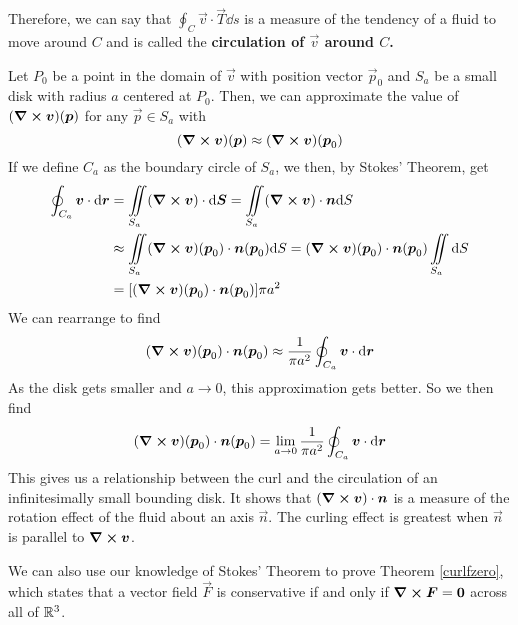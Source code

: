 Therefore, we can say that $\oint_C \vec v\cdot \vec T \dd s$ is a measure of the tendency of a fluid to move around $C$ and is called the \bf{circulation} of $\vec v$ around $C$. \par
Let $P_0$ be a point in the domain of $\vec v$ with position vector $\vec p_0$ and $S_a$ be a small disk with radius $a$ centered at $P_0$. Then, we can approximate the value of $(\curl \boldsymbol{v})(\boldsymbol{p})$ for any $\vec p\in S_a$ with
\[ (\curl \boldsymbol{v})(\boldsymbol{p}) \approx (\curl \boldsymbol{v})(\boldsymbol{p}_0)\]
If we define $C_a$ as the boundary circle of $S_a$, we then, by Stokes' Theorem, get
\begin{align*}
    \oint_{C_a} \vec v\cdot \dd \vec r &= \iint\limits_{S_a}(\curl \vec v)\cdot \dd \vec S = \iint\limits_{S_a}( \curl \vec v) \cdot \vec n \dd S \\
    &\approx \iint\limits_{S_a} (\curl \vec v)(\vec p_0) \cdot \vec n(\vec p_0) \dd S = (\curl \vec v)(\vec p_0) \cdot \vec n(\vec p_0)\iint\limits_{S_a}\dd S \\
    &= \bqty{(\curl \vec v)(\vec p_0) \cdot \vec n(\vec p_0)} \pi a^2
\end{align*}
We can rearrange to find
\[ (\curl \boldsymbol{v})(\boldsymbol{p}_0)\cdot \boldsymbol{n}(\boldsymbol{p}_0) \approx \frac{1}{\pi a^2} \oint_{C_a}\boldsymbol{v}\cdot \dd \boldsymbol{r}\]
As the disk gets smaller and $a\to 0$, this approximation gets better. So we then find
\[ (\curl \boldsymbol{v})(\boldsymbol{p}_0) \cdot \boldsymbol{n}(\boldsymbol{p}_0) = \lim_{a\to 0}\frac{1}{\pi a^2}\oint_{C_a}\boldsymbol{v} \cdot \dd \boldsymbol{r}\]
This gives us a relationship between the curl and the circulation of an infinitesimally small bounding disk. It shows that $(\curl \boldsymbol{v}) \cdot \boldsymbol{n}$ is a measure of the rotation effect of the fluid about an axis $\vec n$. The curling effect is greatest when $\vec n$ is parallel to $\curl \boldsymbol{v}$. \par
We can also use our knowledge of Stokes' Theorem to prove Theorem \ref{curlfzero}, which states that a vector field $\vec F$ is conservative if and only if $\curl \boldsymbol{F} = \boldsymbol{0}$ across all of $\mathbb{R}^3$. 
